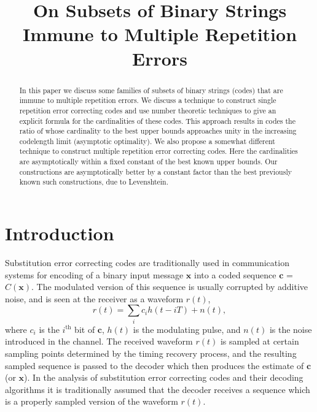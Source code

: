 \documentclass[10pt,conference]{IEEEtran}
\begin{document}
\title{On Subsets of Binary Strings Immune to Multiple Repetition
Errors}
\author{
 \and
{}
} \maketitle

\begin{abstract}In this paper we discuss some families of
subsets of binary strings (codes) that are immune to multiple
repetition errors. We discuss a technique to
construct single repetition error correcting codes and
use number theoretic techniques to give an explicit formula
for the cardinalities of these codes.
This approach results in codes the ratio of whose
cardinality to the best upper bounds approaches unity in the
increasing codelength limit (asymptotic optimality).
We also propose a somewhat different technique to
construct multiple
repetition error correcting codes.
Here the cardinalities are asymptotically
within a fixed constant of the best known upper bounds.
Our constructions are asymptotically better by a
constant factor than the best previously
known such constructions, due to Levenshtein.
\end{abstract}

\section{Introduction}

Substitution error correcting codes are traditionally used in
communication systems for encoding of a binary input message
$\mathbf{x}$ into a coded sequence $\mathbf{c}$ = $C(\mathbf{x})$.
The modulated version of this sequence is usually corrupted by
additive noise, and is seen at the receiver as a waveform $r(t)$,
\begin{equation}\label{eq:rt}
r(t)=\sum_{i} c_i h(t-iT) +n(t),
\end{equation}
where $c_i$ is the $i^{\text{th}}$ %
bit of $\mathbf{c}$, $h(t)$ is the modulating pulse, and $n(t)$ is
the noise introduced in the channel. The received waveform $r(t)$ is
sampled at certain sampling points determined by the timing recovery
process, and the resulting sampled sequence is passed to the decoder
which then produces the estimate of $\mathbf{c}$ (or $\mathbf{x}$).
In the analysis of substitution error correcting codes and
their decoding algorithms it is traditionally assumed that the
decoder receives a sequence which is a properly sampled version of the
waveform $r(t)$.
\end{document}
